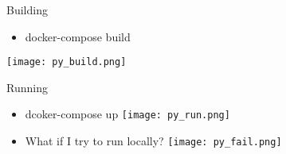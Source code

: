 \documentclass{beamer}
\begin{document}
\begin{frame}{Building}
    \begin{minipage}[t][0.6\textheight][t]{\textwidth}
        \begin{itemize}
            \item docker-compose build
        \end{itemize}
    \end{minipage}

    \vspace{-120pt}

    \begin{center}
        \item \texttt{[image: py\_build.png]} 
    \end{center}

\end{frame}


\begin{frame}{Running}
    \vspace{-20pt}
    \begin{itemize}
        \item dcoker-compose up
        \texttt{[image: py\_run.png]}
        \item What if I try to run locally?
        \texttt{[image: py\_fail.png]}
    \end{itemize}
\end{frame}
\end{document}

